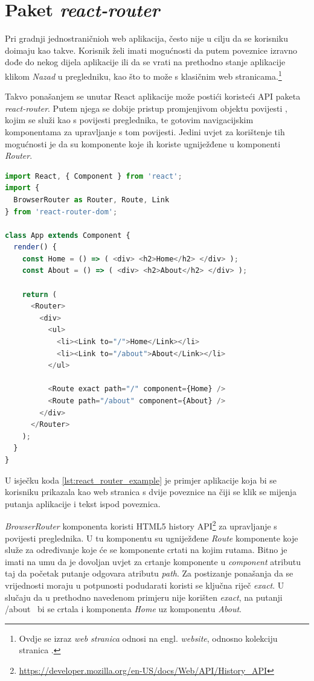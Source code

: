 \documentclass[times, utf8, zavrsni, numeric]{fer}
\newcommand{\razmakp}{\vspace{18pt}}
\newcommand{\razmaks}{\vspace{10pt}}
\begin{document}
\newpage


\section{Paket \emph{react-router}} \label{sec:react-router}

Pri gradnji jednostraničnioh web aplikacija, često nije u cilju da se korisniku doimaju kao takve.
Korisnik želi imati mogućnosti da putem poveznice izravno dođe do nekog dijela aplikacije ili da se vrati na prethodno stanje aplikacije klikom \emph{Nazad} u pregledniku, kao što to može s klasičnim web stranicama.\footnote{Ovdje se izraz \emph{web stranica} odnosi na engl. \emph{website}, odnosno kolekciju stranica .}

Takvo ponašanjem se unutar React aplikacije može postići koristeći API paketa \emph{react-router}.
Putem njega se dobije pristup promjenjivom objektu povijesti , kojim se služi kao s povijesti preglednika, te gotovim navigacijskim komponentama za upravljanje s tom povijesti.
Jedini uvjet za korištenje tih mogućnosti je da su komponente koje ih koriste ugniježđene u komponenti \emph{Router}.\citep{reactRouter}

\razmakp
\begin{lstlisting}[language=JavaScript, caption={Primjer korištenja \emph{react-router}}, label={lst:react_router_example}]
import React, { Component } from 'react';
import { 
  BrowserRouter as Router, Route, Link
} from 'react-router-dom';

class App extends Component {
  render() {
    const Home = () => ( <div> <h2>Home</h2> </div> );
    const About = () => ( <div> <h2>About</h2> </div> );

    return (
      <Router>
        <div>
          <ul>
            <li><Link to="/">Home</Link></li>
            <li><Link to="/about">About</Link></li>
          </ul>

          <Route exact path="/" component={Home} />
          <Route path="/about" component={About} />
        </div>
      </Router>
    );
  }
}
\end{lstlisting}
\razmaks

U isječku koda \ref{lst:react_router_example} je primjer aplikacije koja bi se korisniku prikazala kao web stranica s dvije poveznice na čiji se klik se mijenja putanja aplikacije i tekst ispod poveznica.

\emph{BrowserRouter} komponenta koristi HTML5 history API\footnote{\url{https://developer.mozilla.org/en-US/docs/Web/API/History_API}} za upravljanje s povijesti preglednika.
U tu komponentu su ugniježđene \emph{Route} komponente koje služe za određivanje koje će se komponente crtati na kojim rutama.
Bitno je imati na umu da je dovoljan uvjet za crtanje komponente u \emph{component} atributu taj da početak putanje odgovara atributu \emph{path}.
Za postizanje ponašanja da se vrijednosti moraju u potpunosti podudarati koristi se ključna riječ \emph{exact}.
U slučaju da u prethodno navedenom primjeru nije korišten \emph{exact}, na putanji \glqq /about\grqq ~ bi se crtala i komponenta \emph{Home} uz komponentu \emph{About}.
\end{document}
